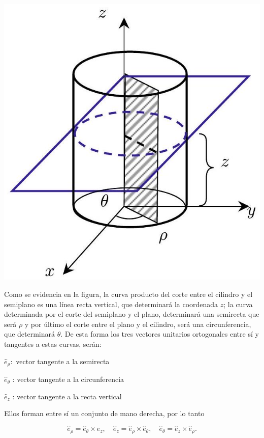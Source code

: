 \begin{center}
  \includegraphics[max width=\textwidth]{coord_cilindricas.jpg}
\end{center}

Como se evidencia en la figura, la curva producto del corte entre el cilindro y el semiplano es una línea recta vertical, que determinará la coordenada $z$; la curva determinada por el corte del semiplano y el plano, determinará una semirecta que será $\rho$ y por último el corte entre el plano y el cilindro, será una circunferencia, que determinará $\theta$. De esta forma los tres vectores unitarios ortogonales entre sí y tangentes a estas curvas, serán:

$\hat{e}_{\rho}:$ vector tangente a la semirecta

$\hat{e}_{\theta}$ : vector tangente a la circunferencia

$\hat{e}_{z}$ : vector tangente a la recta vertical

Ellos forman entre sí un conjunto de mano derecha, por lo tanto

$$
\hat{e}_{\rho}=\hat{e}_{\theta} \times \hat{e}_{z}, \quad \hat{e}_{z}=\hat{e}_{\rho} \times \hat{e}_{\theta}, \quad \widehat{e}_{\theta}=\hat{e}_{z} \times \hat{e}_{\rho} .
$$

